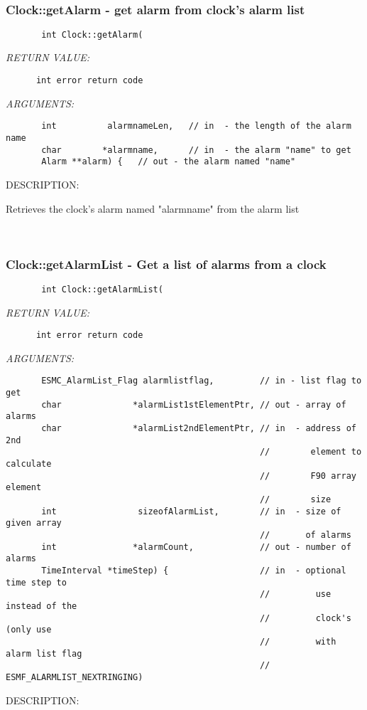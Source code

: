\mbox{}\hrulefill\ 
 
\subsubsection [Clock::getAlarm] {Clock::getAlarm - get alarm from clock's alarm list}


  
\begin{verbatim}       int Clock::getAlarm(\end{verbatim}{\em RETURN VALUE:}
\begin{verbatim}      int error return code\end{verbatim}{\em ARGUMENTS:}
\begin{verbatim}       int          alarmnameLen,   // in  - the length of the alarm name
       char        *alarmname,      // in  - the alarm "name" to get
       Alarm **alarm) {   // out - the alarm named "name"\end{verbatim}
{\sf DESCRIPTION:\\ }


       Retrieves the clock's alarm named "alarmname" from the alarm list
   
 
\mbox{}\hrulefill\ 
 
\subsubsection [Clock::getAlarmList] {Clock::getAlarmList - Get a list of alarms from a clock}


  
\begin{verbatim}       int Clock::getAlarmList(\end{verbatim}{\em RETURN VALUE:}
\begin{verbatim}      int error return code\end{verbatim}{\em ARGUMENTS:}
\begin{verbatim}       ESMC_AlarmList_Flag alarmlistflag,         // in - list flag to get
       char              *alarmList1stElementPtr, // out - array of alarms
       char              *alarmList2ndElementPtr, // in  - address of 2nd
                                                  //        element to calculate
                                                  //        F90 array element
                                                  //        size
       int                sizeofAlarmList,        // in  - size of given array
                                                  //       of alarms
       int               *alarmCount,             // out - number of alarms
       TimeInterval *timeStep) {                  // in  - optional time step to
                                                  //         use instead of the
                                                  //         clock's (only use
                                                  //         with alarm list flag
                                                  // ESMF_ALARMLIST_NEXTRINGING)\end{verbatim}
{\sf DESCRIPTION:\\ }


